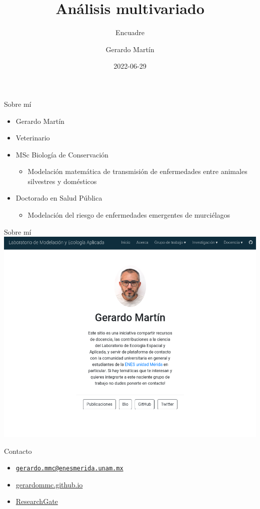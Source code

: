 \documentclass[
  11pt,
  ignorenonframetext,
]{beamer}
\title{Análisis multivariado}
\subtitle{Encuadre}
\author{Gerardo Martín}
\date{2022-06-29}
\providecommand{\tightlist}{%
  \setlength{\itemsep}{0pt}\setlength{\parskip}{0pt}}
\begin{document}
\frame{\titlepage}

\begin{frame}{Sobre mí}
\protect\hypertarget{sobre-muxed}{}
\begin{itemize}
\item
  Gerardo Martín
\item
  Veterinario
\item
  MSc Biología de Conservación

  \begin{itemize}
  \tightlist
  \item
    Modelación matemática de transmisión de enfermedades entre animales
    silvestres y domésticos
  \end{itemize}
\item
  Doctorado en Salud Pública

  \begin{itemize}
  \tightlist
  \item
    Modelación del riesgo de enfermedades emergentes de murciélagos
  \end{itemize}
\end{itemize}
\end{frame}

\begin{frame}{Sobre mí}
\protect\hypertarget{sobre-muxed-1}{}
\includegraphics{Figuras Encuadre/Labo.png}
\end{frame}

\begin{frame}{Contacto}
\protect\hypertarget{contacto}{}
\begin{itemize}
\tightlist
\item
  \href{mailto:gerardo.mmc@enesmerida.unam.mx}{\nolinkurl{gerardo.mmc@enesmerida.unam.mx}}
\item
  \href{https://gerardommc.github.io}{gerardommc.github.io}
\item
  \href{https://www.researchgate.net/profile/Gerardo-Martin}{ResearchGate}
\end{itemize}
\end{frame}
\end{document}
